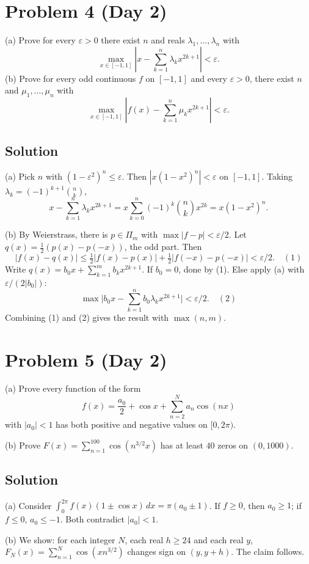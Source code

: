 \documentclass{article}
\begin{document}
\section*{Problem 4 (Day 2)}
(a) Prove for every $\varepsilon > 0$ there exist $n$ and reals $\lambda_1, \ldots, \lambda_n$ with
\[
\max_{x\in[-1,1]}\left|x - \sum_{k=1}^n \lambda_k x^{2k+1}\right| < \varepsilon.
\]
(b) Prove for every odd continuous $f$ on $[-1,1]$ and every $\varepsilon > 0$, there exist $n$ and $\mu_1, \ldots, \mu_n$ with
\[
\max_{x\in[-1,1]}\left|f(x) - \sum_{k=1}^n \mu_k x^{2k+1}\right| < \varepsilon.
\]

\subsection*{Solution}
(a) Pick $n$ with $(1 - \varepsilon^2)^n \leq \varepsilon$. Then $|x(1 - x^2)^n| < \varepsilon$ on $[-1,1]$. Taking $\lambda_k = (-1)^{k+1}\binom{n}{k}$,
\[
x - \sum_{k=1}^n \lambda_k x^{2k+1} = x\sum_{k=0}^n (-1)^k\binom{n}{k} x^{2k} = x(1-x^2)^n.
\]

(b) By Weierstrass, there is $p \in \Pi_m$ with $\max |f - p| < \varepsilon/2$. Let $q(x) = \tfrac{1}{2}(p(x) - p(-x))$, the odd part. Then
\[
|f(x) - q(x)| \leq \tfrac{1}{2}|f(x) - p(x)| + \tfrac{1}{2}|f(-x) - p(-x)| < \varepsilon/2. \quad (1)
\]
Write $q(x) = b_0 x + \sum_{k=1}^m b_k x^{2k+1}$. If $b_0 = 0$, done by (1). Else apply (a) with $\varepsilon/(2|b_0|)$:
\[
\max\Big|b_0 x - \sum_{k=1}^n b_0 \lambda_k x^{2k+1}\Big| < \varepsilon/2. \quad (2)
\]
Combining (1) and (2) gives the result with $\max(n,m)$.

\section*{Problem 5 (Day 2)}
(a) Prove every function of the form
\[
f(x) = \frac{a_0}{2} + \cos x + \sum_{n=2}^N a_n \cos(nx)
\]
with $|a_0| < 1$ has both positive and negative values on $[0, 2\pi)$.

(b) Prove $F(x) = \sum_{n=1}^{100} \cos(n^{3/2} x)$ has at least $40$ zeros on $(0, 1000)$.

\subsection*{Solution}
(a) Consider $\int_0^{2\pi} f(x)(1 \pm \cos x)\,dx = \pi(a_0 \pm 1)$. If $f \geq 0$, then $a_0 \geq 1$; if $f \leq 0$, $a_0 \leq -1$. Both contradict $|a_0|<1$.

(b) We show: for each integer $N$, each real $h \geq 24$ and each real $y$, $F_N(x) = \sum_{n=1}^N \cos(xn^{3/2})$ changes sign on $(y, y+h)$. The claim follows.
\end{document}

